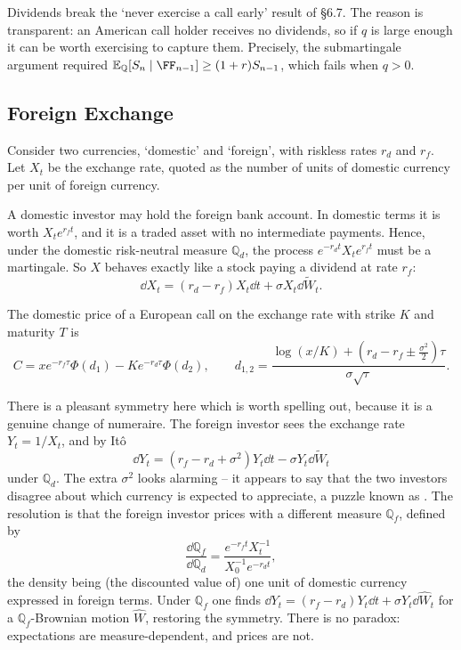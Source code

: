 \documentclass[a4paper]{scrartcl}
\newcommand{\QQ}{\mathbb{Q}}
\begin{document}
Dividends break the `never exercise a call early' result of \S6.7. The reason is transparent: an American call holder receives no dividends, so if $q$ is large enough it can be worth exercising to capture them. Precisely, the submartingale argument required $\EE_\QQ[S_n\mid\FF_{n-1}]\geq (1+r)S_{n-1}$, which fails when $q > 0$.

\subsection{Foreign Exchange}

Consider two currencies, `domestic' and `foreign', with riskless rates $r_d$ and $r_f$. Let $X_t$ be the exchange rate, quoted as the number of units of domestic currency per unit of foreign currency.

A domestic investor may hold the foreign bank account. In domestic terms it is worth $X_te^{r_ft}$, and it is a traded asset with no intermediate payments. Hence, under the domestic risk-neutral measure $\QQ_d$, the process $e^{-r_dt}X_te^{r_ft}$ must be a martingale. So $X$ behaves exactly like a stock paying a dividend at rate $r_f$:
$$
\dd X_t = (r_d - r_f)X_t\dd t + \sigma X_t\dd \tilde W_t.
$$

\begin{proposition}
	The domestic price of a European call on the exchange rate with strike $K$ and maturity $T$ is
	$$
	C = xe^{-r_f\tau}\Phi(d_1) - Ke^{-r_d\tau}\Phi(d_2), \qquad d_{1,2} = \frac{\log(x/K) + (r_d - r_f \pm \tfrac{\sigma^2}{2})\tau}{\sigma\sqrt\tau}.
	$$
\end{proposition}

There is a pleasant symmetry here which is worth spelling out, because it is a genuine change of numeraire. The foreign investor sees the exchange rate $Y_t = 1/X_t$, and by It\^o
$$
\dd Y_t = (r_f - r_d + \sigma^2)Y_t\dd t - \sigma Y_t\dd\tilde W_t
$$
under $\QQ_d$. The extra $\sigma^2$ looks alarming -- it appears to say that the two investors disagree about which currency is expected to appreciate, a puzzle known as . The resolution is that the foreign investor prices with a different measure $\QQ_f$, defined by
$$
\frac{\dd\QQ_f}{\dd\QQ_d} = \frac{e^{-r_ft}X_t^{-1}}{X_0^{-1}e^{-r_dt}},
$$
the density being (the discounted value of) one unit of domestic currency expressed in foreign terms. Under $\QQ_f$ one finds $\dd Y_t = (r_f - r_d)Y_t\dd t + \sigma Y_t\dd \hat W_t$ for a $\QQ_f$-Brownian motion $\hat W$, restoring the symmetry. There is no paradox: expectations are measure-dependent, and prices are not.
\end{document}
